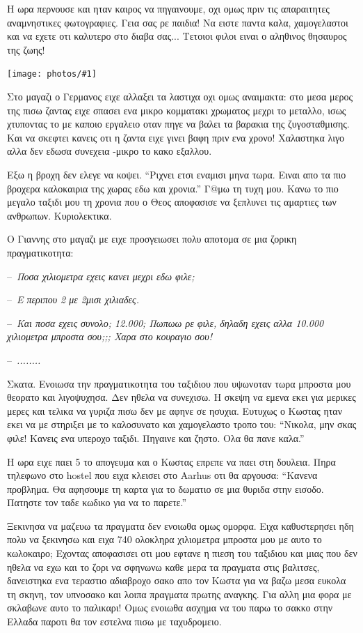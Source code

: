 \documentclass[11pt, letterpaper]{book}
\newcommand\dialogue[1]{\par\noindent--~\textit{#1}}
\newcommand\photo[1]{\begin{center}\noindent\texttt{[image: photos/\#1]}\end{center}}
\begin{document}
Η ωρα περνουσε και ηταν καιρος να πηγαινουμε, οχι ομως πριν τις απαραιτητες αναμνηστικες φωτογραφιες. Γεια σας ρε παιδια! Να ειστε παντα καλα, χαμογελαστοι και να εχετε οτι καλυτερο στο διαβα σας... Τετοιοι φιλοι ειναι ο αληθινος θησαυρος της ζωης!

\photo{129.jpg}

Στο μαγαζι ο Γερμανος ειχε αλλαξει τα λαστιχα οχι ομως αναιμακτα: στο μεσα μερος της πισω ζαντας ειχε σπασει ενα μικρο κομματακι χρωματος μεχρι το μεταλλο, ισως χτυποντας το με καποιο εργαλειο οταν πηγε να βαλει τα βαρακια της ζυγοσταθμισης. Και να σκεφτει κανεις οτι η ζαντα ειχε γινει βαφη πριν ενα χρονο! Χαλαστηκα λιγο αλλα δεν εδωσα συνεχεια -μικρο το κακο εξαλλου.

Εξω η βροχη δεν ελεγε να κοψει. ``Ριχνει ετσι εναμισι μηνα τωρα. Ειναι απο τα πιο βροχερα καλοκαιρια της χωρας εδω και χρονια.''
Γ@μω τη τυχη μου. Κανω το πιο μεγαλο ταξιδι μου τη χρονια που ο Θεος αποφασισε να ξεπλυνει τις αμαρτιες των ανθρωπων. Κυριολεκτικα.

Ο Γιαννης στο μαγαζι με ειχε προσγειωσει πολυ αποτομα σε μια ζορικη πραγματικοτητα:

\dialogue{Ποσα χιλιομετρα εχεις κανει μεχρι εδω φιλε;}
\dialogue{Ε περιπου 2 με 2μισι χιλιαδες.}
\dialogue{Και ποσα εχεις συνολο; 12.000; Πωπωω ρε φιλε, δηλαδη εχεις αλλα 10.000 χιλιομετρα μπροστα σου;;; Χαρα στο κουραγιο σου!}
\dialogue{........}

Σκατα. Ενοιωσα την πραγματικοτητα του ταξιδιου που υψωνοταν τωρα μπροστα μου θεορατο και λιγοψυχησα. Δεν ηθελα να συνεχισω. Η σκεψη να εμενα εκει για μερικες μερες και τελικα να γυριζα πισω δεν με αφηνε σε ησυχια. Ευτυχως ο Κωστας ηταν εκει να με στηριξει με το καλοσυνατο και χαμογελαστο τροπο του: ``Νικολα, μην σκας φιλε! Κανεις ενα υπεροχο ταξιδι. Πηγαινε και ζηστο. Ολα θα πανε καλα.''

Η ωρα ειχε παει 5 το απογευμα και ο Κωστας επρεπε να παει στη δουλεια. Πηρα τηλεφωνο στο hostel που ειχα κλεισει στο Aarhus οτι θα αργουσα: ``Κανενα προβλημα. Θα αφησουμε τη καρτα για το δωματιο σε μια θυριδα στην εισοδο. Πατηστε τον ταδε κωδικο για να το παρετε.''

Ξεκινησα να μαζευω τα πραγματα δεν ενοιωθα ομως ομορφα. Ειχα καθυστερησει ηδη πολυ να ξεκινησω και ειχα 740 ολοκληρα χιλιομετρα μπροστα μου με αυτο το κωλοκαιρο; 
Εχοντας αποφασισει οτι μου εφτανε η πιεση του ταξιδιου και μιας που δεν ηθελα να εχω και το ζορι να σφηνωνω καθε μερα τα πραγματα στις βαλιτσες, δανειστηκα ενα τεραστιο αδιαβροχο σακο απο τον Κωστα για να βαζω μεσα ευκολα τη σκηνη, τον υπνοσακο και λοιπα πραγματα πρωτης αναγκης. 
Για αλλη μια φορα με σκλαβωνε αυτο το παλικαρι! Ομως ενοιωθα ασχημα να του παρω το σακκο στην Ελλαδα παροτι θα τον εστελνα πισω με ταχυδρομειο.
\end{document}

